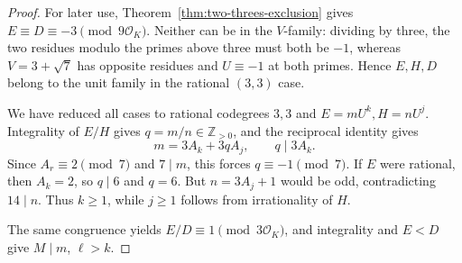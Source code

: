 \documentclass[11pt,reqno]{amsart}
\theoremstyle{remark}\newtheorem{remark}[theorem]{Remark}
\numberwithin{equation}{section}
\begin{document}
\begin{proof}
For later use, Theorem~\ref{thm:two-threes-exclusion} gives
$E\equiv D\equiv-3\pmod{9\mathcal O_K}$. Neither can be in the
$V$-family: dividing by three, the two residues modulo the primes
above three must both be $-1$, whereas $V=3+\sqrt7$ has opposite
residues and $U\equiv-1$ at both primes. Hence $E,H,D$ belong to the
unit family in the rational $(3,3)$ case.

We have reduced all cases to rational codegrees $3,3$ and
$E=mU^k,H=nU^j$.
Integrality of $E/H$ gives $q=m/n\in\mathbb Z_{>0}$, and the
reciprocal identity gives
\[
 m=3A_k+3qA_j,\qquad q\mid3A_k.
\]
Since $A_r\equiv2\pmod7$ and $7\mid m$, this forces
$q\equiv-1\pmod7$.
If $E$ were rational, then $A_k=2$, so $q\mid6$ and $q=6$.
But $n=3A_j+1$ would be odd, contradicting $14\mid n$.
Thus $k\ge1$, while $j\ge1$ follows from irrationality of $H$.

The same congruence yields $E/D\equiv1\pmod{3\mathcal O_K}$, and
integrality and $E<D$ give $M\mid m$, $\ell>k$.
\end{proof}
\end{document}
